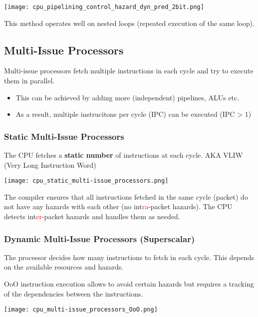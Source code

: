 \begin{multicols*}{2}
    \newpar{}
    \begin{center}
        \texttt{[image: cpu\_pipelining\_control\_hazard\_dyn\_pred\_2bit.png]}
    \end{center}

    This method operates well on nested loops (repeated execution of the same loop).

    \subsection{Multi-Issue Processors}\label{multi-issue processors}
    Multi-issue processors fetch multiple instructions in each cycle and try to execute them in parallel.
    \begin{itemize}
        \item This can be achieved by adding more (independent) pipelines, ALUs etc.
        \item As a result, multiple instrucitons per cycle (IPC) can be executed (IPC > 1)
    \end{itemize}
    \subsubsection{Static Multi-Issue Processors}
    The CPU fetches a \textbf{static number} of instructions at each cycle. AKA VLIW (Very Long Instruction Word)

    \texttt{[image: cpu\_static\_multi-issue\_processors.png]}

    The compiler ensures that all instructions fetched in the same cycle (packet) do not have any hazards with each other (no int\textcolor{red}{ra}-packet hazards). The CPU detects int\textcolor{red}{er}-packet hazards and handles them as needed.

    \subsubsection{Dynamic Multi-Issue Processors (Superscalar)}
    The processor decides how many instructions to fetch in each cycle. This depends on the available resources and hazards.
    \newpar{}

    OoO instruction execution allows to avoid certain hazards but requires a tracking of the dependencies between the instructions.
    \begin{center}
        \texttt{[image: cpu\_multi-issue\_processors\_OoO.png]}
    \end{center}

\end{multicols*}